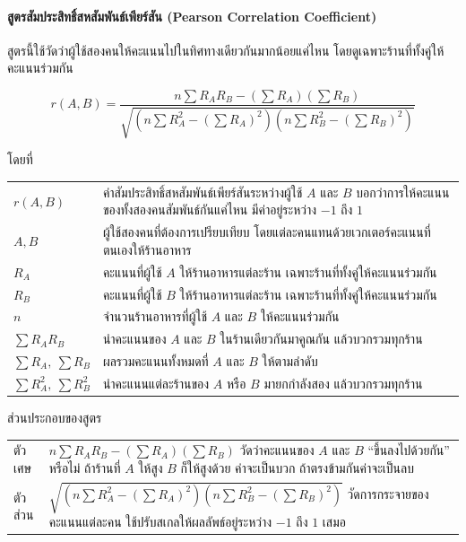 \vspace{1em}
\paragraph{สูตรสัมประสิทธิ์สหสัมพันธ์เพียร์สัน (Pearson Correlation Coefficient)}
สูตรนี้ใช้วัดว่าผู้ใช้สองคนให้คะแนนไปในทิศทางเดียวกันมากน้อยแค่ไหน โดยดูเฉพาะร้านที่ทั้งคู่ให้คะแนนร่วมกัน

\begin{equation}
r(A,B)=
\frac{n\sum R_A R_B-\left(\sum R_A\right)\left(\sum R_B\right)}
{\sqrt{\left(n\sum R_A^2-\left(\sum R_A\right)^2\right)
\left(n\sum R_B^2-\left(\sum R_B\right)^2\right)}}
\label{eq:pearson}
\end{equation}

\noindent โดยที่

\noindent
\begin{tabular}{@{}l @{\ :\ } p{}}
$r(A,B)$ & ค่าสัมประสิทธิ์สหสัมพันธ์เพียร์สันระหว่างผู้ใช้ $A$ และ $B$ บอกว่าการให้คะแนนของทั้งสองคนสัมพันธ์กันแค่ไหน มีค่าอยู่ระหว่าง $-1$ ถึง $1$ \\
$A, B$ & ผู้ใช้สองคนที่ต้องการเปรียบเทียบ โดยแต่ละคนแทนด้วยเวกเตอร์คะแนนที่ตนเองให้ร้านอาหาร \\
$R_A$ & คะแนนที่ผู้ใช้ $A$ ให้ร้านอาหารแต่ละร้าน เฉพาะร้านที่ทั้งคู่ให้คะแนนร่วมกัน \\
$R_B$ & คะแนนที่ผู้ใช้ $B$ ให้ร้านอาหารแต่ละร้าน เฉพาะร้านที่ทั้งคู่ให้คะแนนร่วมกัน \\
$n$ & จำนวนร้านอาหารที่ผู้ใช้ $A$ และ $B$ ให้คะแนนร่วมกัน \\
$\sum R_A R_B$ & นำคะแนนของ $A$ และ $B$ ในร้านเดียวกันมาคูณกัน แล้วบวกรวมทุกร้าน \\
$\sum R_A,\ \sum R_B$ & ผลรวมคะแนนทั้งหมดที่ $A$ และ $B$ ให้ตามลำดับ \\
$\sum R_A^2,\ \sum R_B^2$ & นำคะแนนแต่ละร้านของ $A$ หรือ $B$ มายกกำลังสอง แล้วบวกรวมทุกร้าน \\
\end{tabular}

\bigskip
\noindent ส่วนประกอบของสูตร

\medskip
\noindent
\begin{tabular}{@{}l @{\ :\ } p{}}
ตัวเศษ & $n\sum R_A R_B-\left(\sum R_A\right)\left(\sum R_B\right)$ วัดว่าคะแนนของ $A$ และ $B$ ``ขึ้นลงไปด้วยกัน'' หรือไม่ ถ้าร้านที่ $A$ ให้สูง $B$ ก็ให้สูงด้วย ค่าจะเป็นบวก ถ้าตรงข้ามกันค่าจะเป็นลบ \\[1.5em]
ตัวส่วน & $\sqrt{\left(n\sum R_A^2-\left(\sum R_A\right)^2\right)\left(n\sum R_B^2-\left(\sum R_B\right)^2\right)}$ วัดการกระจายของคะแนนแต่ละคน ใช้ปรับสเกลให้ผลลัพธ์อยู่ระหว่าง $-1$ ถึง $1$ เสมอ \\
\end{tabular}

